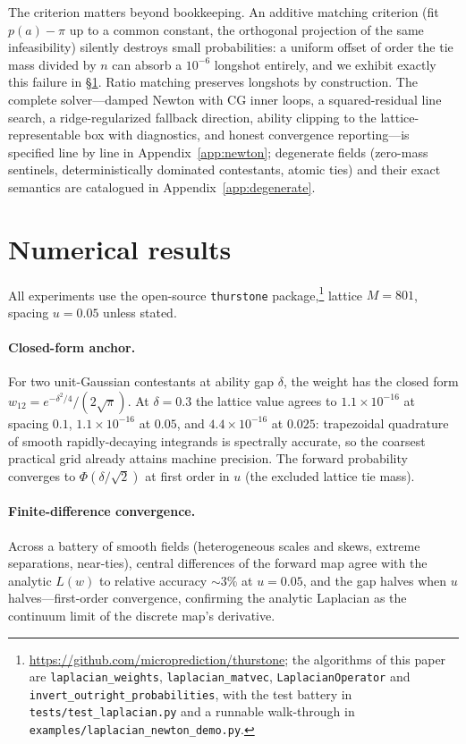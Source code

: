\documentclass[11pt]{article}
\theoremstyle{definition}
\theoremstyle{remark}
\begin{document}
The criterion matters beyond bookkeeping.  An additive matching criterion
(fit $p(a) - \pi$ up to a common constant, the orthogonal projection of the
same infeasibility) silently destroys small probabilities: a uniform offset
of order the tie mass divided by $n$ can absorb a $10^{-6}$ longshot
entirely, and we exhibit exactly this failure in
\S\ref{sec:experiments}.  Ratio matching preserves longshots by
construction.  The complete solver---damped Newton with CG inner loops, a
squared-residual line search, a ridge-regularized fallback direction, ability
clipping to the lattice-representable box with diagnostics, and honest
convergence reporting---is specified line by line in
Appendix~\ref{app:newton}; degenerate fields (zero-mass sentinels,
deterministically dominated contestants, atomic ties) and their exact
semantics are catalogued in Appendix~\ref{app:degenerate}.

\section{Numerical results}
\label{sec:experiments}

All experiments use the open-source \texttt{thurstone} package,\footnote{%
\url{https://github.com/microprediction/thurstone}; the algorithms of this
paper are \texttt{laplacian\_weights}, \texttt{laplacian\_matvec},
\texttt{LaplacianOperator} and \texttt{invert\_outright\_probabilities},
with the test battery in \texttt{tests/test\_laplacian.py} and a runnable
walk-through in \texttt{examples/laplacian\_newton\_demo.py}.}
lattice $M = 801$, spacing $u = 0.05$ unless stated.

\paragraph{Closed-form anchor.}
For two unit-Gaussian contestants at ability gap $\delta$, the weight has the
closed form $w_{12} = e^{-\delta^2/4} / (2\sqrt{\pi})$.  At $\delta = 0.3$
the lattice value agrees to $1.1\times10^{-16}$ at spacing $0.1$,
$1.1\times10^{-16}$ at $0.05$, and $4.4\times10^{-16}$ at $0.025$:
trapezoidal quadrature of smooth rapidly-decaying integrands is spectrally
accurate, so the coarsest practical grid already attains machine precision.
The forward probability converges to $\Phi(\delta/\sqrt2)$ at first order in
$u$ (the excluded lattice tie mass).

\paragraph{Finite-difference convergence.}
Across a battery of smooth fields (heterogeneous scales and skews, extreme
separations, near-ties), central differences of the forward map agree with
the analytic $L(w)$ to relative accuracy $\sim\!3\%$ at $u = 0.05$, and the
gap halves when $u$ halves---first-order convergence, confirming the
analytic Laplacian as the continuum limit of the discrete map's derivative.
\end{document}
